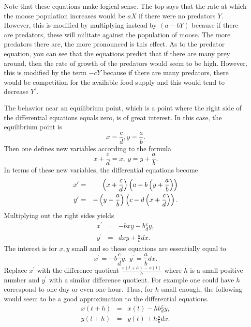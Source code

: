 Note that these equations make logical sense. The top says that the
rate at which the moose population increases would be $aX$ if there
were no predators $Y$.  However, this is modified by multiplying
instead by $(a-bY) $ because if there are predators, these will
militate against the population of moose.  The more predators there
are, the more pronounced is this effect. As to the predator equation,
you can see that the equations predict that if there are many prey
around, then the rate of growth of the predators would seem to be
high. However, this is modified by the term $-cY$ because if there are
many predators, there would be competition for the available food
supply and this would tend to decrease $Y^{\prime }$.

The behavior near an equilibrium point, which is a point where the
right side of the differential equations equals zero, is of great
interest. In this case, the equilibrium point is
\begin{equation*}
  x=\frac{c}{d}, y=\frac{a}{b}.
\end{equation*}
Then one defines new variables according to the formula
\begin{equation*}
  x+\frac{c}{d}=x,\ y=y+\frac{a}{b}.
\end{equation*}
In terms of these new variables, the differential equations become
\begin{eqnarray*}
  x^{\prime } &=&\left(x+\frac{c}{d}\right) \left(a-b\left(y+\frac{a}{b}
                  \right)\right) \\
  y^{\prime } &=&-\left(y+\frac{a}{b}\right) \left(c-d\left(x+\frac{c}{d}
                  \right)\right).
\end{eqnarray*}
Multiplying out the right sides yields
\begin{eqnarray*}
  x^{\prime } &=&-bxy-b\frac{c}{d}y, \\
  y^{\prime } &=&dxy+\frac{a}{b}dx.
\end{eqnarray*}
The interest is for $x,y$ small and so these equations are essentially
equal to
\begin{equation*}
  x^{\prime }=-b\frac{c}{d}y,\ y^{\prime }=\frac{a}{b}dx.
\end{equation*}
Replace $x^{\prime }$ with the difference quotient
$\frac{x(t+h) -x(t) }{h}$ where $h$ is a small positive number and
$y^{\prime } $ with a similar difference quotient. For example one
could have $h$ correspond to one day or even one hour. Thus, for $h$
small enough, the following would seem to be a good approximation to
the differential equations.
\begin{eqnarray*}
  x(t+h) &=&x(t) -hb\frac{c}{d}y, \\
  y(t+h) &=&y(t) +h\frac{a}{b}dx.
\end{eqnarray*}
